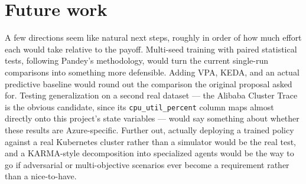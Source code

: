\documentclass{rapportINPTCLOUD}
\begin{document}
\section{Future work}
\label{sec:future}

A few directions seem like natural next steps, roughly in order of how much effort each would take relative to the payoff. Multi-seed training with paired statistical tests, following Pandey's methodology, would turn the current single-run comparisons into something more defensible. Adding VPA, KEDA, and an actual predictive baseline would round out the comparison the original proposal asked for. Testing generalization on a second real dataset — the Alibaba Cluster Trace is the obvious candidate, since its \texttt{cpu\_util\_percent} column maps almost directly onto this project's state variables — would say something about whether these results are Azure-specific. Further out, actually deploying a trained policy against a real Kubernetes cluster rather than a simulator would be the real test, and a KARMA-style decomposition into specialized agents would be the way to go if adversarial or multi-objective scenarios ever become a requirement rather than a nice-to-have.

\clearpage
\printbibliography
\end{document}
